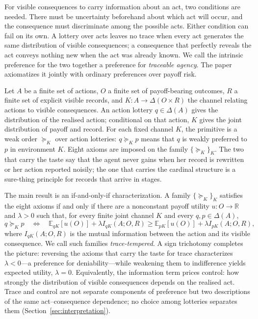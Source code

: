 \documentclass[11pt,a4paper]{article}
\theoremstyle{definition}
\newcommand{\E}{\mathbb E}
\newcommand{\1}{\mathbf 1}
\begin{document}
For visible consequences to carry information about an act, two conditions are needed.  There must be uncertainty
beforehand about which act will occur, and the consequence must discriminate among the
possible acts.  Either condition can fail on its own.  A lottery over acts leaves no trace when every act generates
the same distribution of visible consequences; a consequence that perfectly reveals the act conveys
nothing new when the act was already known.  We call the intrinsic preference for the two together a preference for \emph{traceable agency}.  The paper axiomatizes it jointly with ordinary
preferences over payoff risk.

Let $A$ be a finite set of actions, $O$ a finite set of payoff-bearing
outcomes, $R$ a finite set of explicit visible records, and $K:A\to\Delta(O\times R)$ the channel relating actions to
visible consequences.  An action lottery $q\in\Delta(A)$ gives the distribution of the realised action; conditional
on that action, $K$ gives the joint distribution of payoff and record.  For each fixed channel $K$, the primitive is a
weak order $\succeq_K$ over action lotteries: $q\succeq_Kp$ means that $q$ is weakly preferred to
$p$ in environment $K$.  Eight axioms are imposed on the family $\{\succeq_K\}_K$.  The two that carry the
taste say that the agent never gains when her record is rewritten or her action reported noisily; the one that
carries the cardinal structure is a sure-thing principle for records that arrive in stages.

The main result is an if-and-only-if characterization.  A family $\{\succeq_K\}_K$ satisfies the eight axioms if and
only if there are a nonconstant payoff utility $u:O\to\mathbb R$ and $\lambda>0$ such that, for every finite joint
channel $K$ and every $q,p\in\Delta(A)$,
\[
 q\succeq_Kp
 \quad\Longleftrightarrow\quad
 \E_{qK}[u(O)]+\lambda I_{qK}(A;O,R)
 \ge
 \E_{pK}[u(O)]+\lambda I_{pK}(A;O,R),
\]
where $I_{qK}(A;O,R)$ is the mutual information between the action and its visible consequence.  We call such
families \emph{trace-tempered}.  A sign trichotomy completes the picture: reversing the axioms that carry the
taste for trace characterizes $\lambda<0$---a preference for deniability---while weakening them to indifference
yields expected utility, $\lambda=0$.  Equivalently, the information term prices control: how strongly the
distribution of visible consequences depends on the realised act.  Trace and control are not separate components
of preference but two descriptions of the same act--consequence dependence; no choice among lotteries separates
them (Section~\ref{sec:interpretation}).
\end{document}
